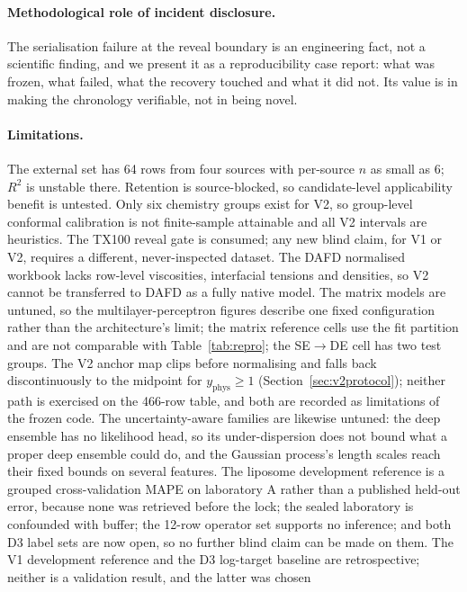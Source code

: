 \documentclass[11pt,a4paper]{article}
\newcommand{\tox}{TX100}
\begin{document}
\paragraph{Methodological role of incident disclosure.} The serialisation
failure at the reveal boundary is an engineering fact, not a scientific
finding, and we present it as a reproducibility case report: what was frozen,
what failed, what the recovery touched and what it did not. Its value is in
making the chronology verifiable, not in being novel.

\paragraph{Limitations.} The external set has 64 rows from four sources with
per-source $n$ as small as 6; $R^2$ is unstable there. Retention is
source-blocked, so candidate-level applicability benefit is untested.
Only six chemistry groups exist for V2, so group-level conformal calibration
is not finite-sample attainable and all V2 intervals are heuristics. The
\tox{} reveal gate is consumed; any new blind claim, for V1 or V2, requires a
different, never-inspected dataset. The DAFD normalised workbook lacks
row-level viscosities, interfacial tensions and densities, so V2 cannot be
transferred to DAFD as a fully native model. The matrix models are untuned,
so the multilayer-perceptron figures describe one fixed configuration rather
than the architecture's limit; the matrix reference cells use the fit
partition and are not comparable with Table~\ref{tab:repro}; the SE$\to$DE
cell has two test groups. The V2 anchor map clips before normalising and
falls back discontinuously to the midpoint for $y_{\mathrm{phys}}\ge 1$
(Section~\ref{sec:v2protocol}); neither path is exercised on the 466-row
table, and both are recorded as limitations of the frozen code. The
uncertainty-aware families are likewise
untuned: the deep ensemble has no likelihood head, so its under-dispersion
does not bound what a proper deep ensemble could do, and the Gaussian
process's length scales reach their fixed bounds on several features. The
liposome development reference is a grouped
cross-validation MAPE on laboratory A rather than a published held-out error,
because none was retrieved before the lock; the sealed laboratory is
confounded with buffer; the 12-row operator set supports no inference; and
both D3 label sets are now open, so no further blind claim can be made on
them. The V1 development reference and the D3 log-target baseline are
retrospective; neither is a validation result, and the latter was chosen
\end{document}
